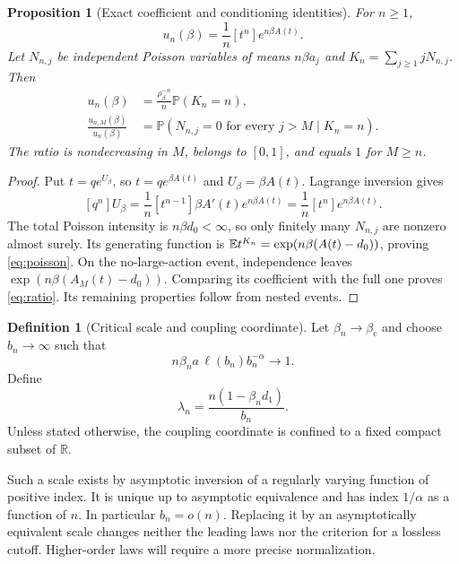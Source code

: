 \documentclass[11pt,a4paper]{article}
\numberwithin{equation}{section}
\newtheorem{proposition}[theorem]{Proposition}
\theoremstyle{definition}\newtheorem{definition}[theorem]{Definition}
\theoremstyle{remark}\newtheorem{remark}[theorem]{Remark}
\theoremstyle{definition}
\newcommand{\R}{\mathbb R}\newcommand{\C}{\mathbb C}
\newcommand{\Prob}{\mathbb P}\newcommand{\ii}{\mathrm i}
\newcommand{\bc}{\beta_{\mathrm c}}\newcommand{\rhoc}{\rho_{\mathrm c}}
\begin{document}
\begin{proposition}[Exact coefficient and conditioning identities]
\label{prop:exact}
For $n\ge1$,
\begin{equation}\label{eq:lagrange}
 u_n(\beta)=\frac1n[t^n]e^{n\beta A(t)}.
\end{equation}
Let $N_{n,j}$ be independent Poisson variables of means $n\beta a_j$ and
$K_n=\sum_{j\ge1}jN_{n,j}$. Then
\begin{align}
 u_n(\beta)&=\frac{\rho_\beta^{-n}}n\Prob(K_n=n),\label{eq:poisson}\\
 \frac{u_{n,M}(\beta)}{u_n(\beta)}
 &=\Prob(N_{n,j}=0\text{ for every }j>M\mid K_n=n).\label{eq:ratio}
\end{align}
The ratio is nondecreasing in $M$, belongs to $[0,1]$, and equals $1$ for
$M\ge n$.
\end{proposition}
\begin{proof}
Put $t=qe^{U_\beta}$, so $t=q e^{\beta A(t)}$ and $U_\beta=\beta A(t)$.
Lagrange inversion gives
\[
 [q^n]U_\beta=\frac1n[t^{n-1}]\beta A'(t)e^{n\beta A(t)}
             =\frac1n[t^n]e^{n\beta A(t)}.
\]
The total Poisson intensity is $n\beta d_0<\infty$, so only finitely many
$N_{n,j}$ are nonzero almost surely. Its generating function is
$\mathbb E t^{K_n}=\exp(n\beta(A(t)-d_0))$, proving \eqref{eq:poisson}.
On the no-large-action event, independence leaves
$\exp(n\beta(A_M(t)-d_0))$. Comparing its coefficient with the full one
proves \eqref{eq:ratio}. Its remaining properties follow from nested events.
\end{proof}

\begin{definition}[Critical scale and coupling coordinate]
\label{def:scale}
Let $\beta_n\to\bc$ and choose $b_n\to\infty$ such that
\begin{equation}\label{eq:bscale}
 n\beta_n a\,\ell(b_n)b_n^{-\alpha}\longrightarrow1.
\end{equation}
Define
\begin{equation}\label{eq:lambdan}
 \lambda_n=\frac{n(1-\beta_n d_1)}{b_n}.
\end{equation}
Unless stated otherwise, the coupling coordinate is confined to a fixed
compact subset of $\R$.
\end{definition}
Such a scale exists by asymptotic inversion of a regularly varying function
of positive index. It is unique up to asymptotic equivalence and has index
$1/\alpha$ as a function of $n$. In particular $b_n=o(n)$. Replacing it by an
asymptotically equivalent scale changes neither the leading laws nor the
criterion for a lossless cutoff. Higher-order laws will require a more
precise normalization.
\end{document}
